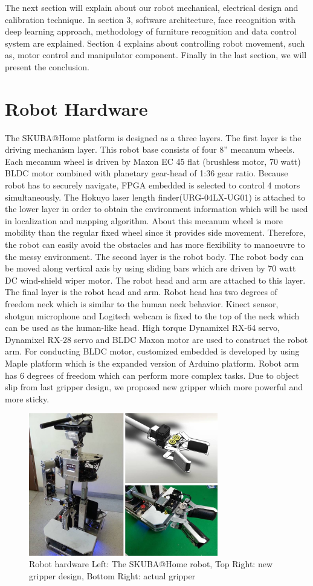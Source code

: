 \documentclass{llncs}
\begin{document}
The next section will explain about our robot mechanical, electrical design and calibration technique. In section 3, software architecture, face recognition with deep learning approach, methodology of furniture recognition and data control system are explained. Section 4 explains about controlling robot movement, such as, motor control and manipulator component. Finally in the last section, we will present the conclusion.

\section{Robot Hardware}

The SKUBA@Home platform is designed as a three layers. The first layer is the driving mechanism layer. This robot base consists of four 8'' mecanum wheels. Each mecanum wheel is driven by Maxon EC 45 flat (brushless motor, 70 watt) BLDC motor combined with planetary gear-head of 1:36 gear ratio. Because robot has to securely navigate, FPGA embedded is selected to control 4 motors simultaneously. The Hokuyo laser length finder(URG-04LX-UG01) is attached to the lower layer in order to obtain the environment information which will be used in localization and mapping algorithm. About this mecanum wheel is more mobility than the regular fixed wheel since it provides side movement. Therefore, the robot can easily avoid the obstacles and has more flexibility to manoeuvre to the messy environment. The second layer is the robot body. The robot body can be moved along vertical axis by using sliding bars which are driven by 70 watt DC wind-shield wiper motor. The robot head and arm are attached to this layer. The final layer is the robot head and arm. Robot head has two degrees of freedom neck which is similar to the human neck behavior. Kinect sensor, shotgun microphone and Logitech webcam is fixed to the top of the neck which can be used as the human-like head. High torque Dynamixel RX-64 servo, Dynamixel RX-28 servo and BLDC Maxon motor are used to construct the robot arm. For conducting BLDC motor, customized embedded is developed by using Maple platform which is the expanded version of Arduino platform\cite{con_arm}. Robot arm has 6 degrees of freedom which can perform more complex tasks. Due to object slip from last gripper design, we proposed new gripper which more powerful and more sticky.

\begin{figure}
\centering
\includegraphics[height=6.2cm]{robot_hardware}
\caption{Robot hardware Left: The SKUBA@Home robot, Top Right: new gripper design, Bottom Right: actual gripper}
\label{fig:base}
\end{figure}
\end{document}
